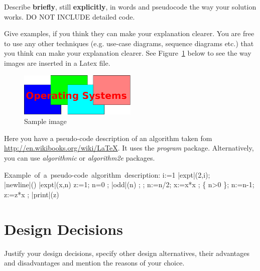 Describe \textbf{briefly}, still \textbf{explicitly}, in words and pseudocode the way your solution works. DO NOT INCLUDE detailed code. 

Give examples, if you think they can make your explanation clearer. You are free to use any other techniques (e.g. use-case diagrams, sequence diagrams etc.) that you think can make your explanation clearer. See Figure~\ref{fig:sample-image} below to see the way images are inserted in a Latex file. 

\begin{figure}[h]
	\centering
	\includegraphics[width=0.5\textwidth]{figures/sample-image.pdf}
	\caption{Sample image}
	\label{fig:sample-image}
\end{figure}


Here you have a pseudo-code description of an algorithm taken fom \\ \href{http://en.wikibooks.org/wiki/LaTeX/Algorithms\_and\_Pseudocode\#Typesetting\_using\_the\_program\_package}{http://en.wikibooks.org/wiki/LaTeX}. It uses the \textit{program} package. Alternatively, you can use \textit{algorithmic} or \textit{algorithm2e} packages. 

\begin{program}
\mbox{Example of a pseudo-code algorithm description:}
\BEGIN %
  \FOR i:=1   \DO
     |expt|(2,i); \\ |newline|() \OD %
\WHERE
\PROC |expt|(x,n) \BODY
          z:=1;
          \DO \IF n=0 \THEN \EXIT \FI;
             \DO \IF |odd|(n) \THEN \EXIT \FI;
;
                n:=n/2; x:=x*x \OD;
             \{ n>0 \};
             n:=n-1; z:=z*x \OD;
          |print|(z) \ENDPROC
\END
\end{program}


\section{Design Decisions}

Justify your design decisions, specify other design alternatives, their advantages and disadvantages and mention the reasons of your choice.  

